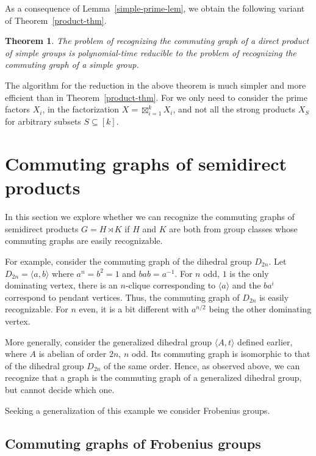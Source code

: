 \documentclass{elsarticle}
\newtheorem{theorem}{Theorem}[section]
\renewcommand{\angle}[1]{\langle#1\rangle} %
\begin{document}
As a consequence of Lemma~\ref{simple-prime-lem}, we obtain the
following variant of Theorem~\ref{product-thm}.

\begin{theorem}
  The problem of recognizing the commuting graph of a direct product
  of simple groups is polynomial-time reducible to the problem of
  recognizing the commuting graph of a simple group.
\end{theorem}

The algorithm for the reduction in the above theorem is much simpler
and more efficient than in Theorem~\ref{product-thm}. For we only need to
consider the prime factors $X_i$, in the factorization
$X=\boxtimes_{i=1}^k X_i$, and not all the strong products $X_S$ for
arbitrary subsets $S\subseteq [k]$.

\section{Commuting graphs of semidirect products}\label{semi-sec}

In this section we explore whether we can recognize the commuting
graphs of semidirect products $G=H\rtimes K$ if $H$ and $K$ are both
from group classes whose commuting graphs are easily recognizable.

For example, consider the commuting graph of the dihedral group
$D_{2n}$.  Let $D_{2n}=\angle{a,b}$ where $a^n=b^2=1$ and
$bab=a^{-1}$. For $n$ odd, $1$ is the only dominating vertex, there is
an $n$-clique corresponding to $\angle{a}$ and the $ba^i$ correspond
to pendant vertices. Thus, the commuting graph of $D_{2n}$ is easily
recognizable. For $n$ even, it is a bit different with $a^{n/2}$
being the other dominating vertex.

More generally, consider the generalized dihedral group $\angle{A,t}$
defined earlier, where $A$ is abelian of order $2n$, $n$ odd. Its
commuting graph is isomorphic to that of the dihedral group $D_{2n}$
of the same order. Hence, as observed above, we can recognize that a
graph is the commuting graph of a generalized dihedral group, but
cannot decide which one.

Seeking a generalization of this example we consider Frobenius groups.

\subsection{Commuting graphs of Frobenius groups}\label{frob-sec}
\end{document}

